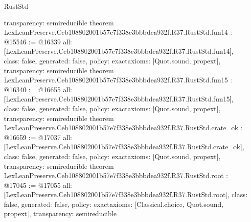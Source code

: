 \begin{lexlean}{RustStd}
\begin{coremodule}
{  transparency: semireducible
}
theorem LexLeanPreserve.Ceb108802001b57e7f338e3bbbdea932f.R37.RustStd.fun14 : @15546 := @16339 {
  all: [LexLeanPreserve.Ceb108802001b57e7f338e3bbbdea932f.R37.RustStd.fun14],
  class: false,
  generated: false,
  policy: exact{axioms: [Quot.sound, propext]},
  transparency: semireducible
}
theorem LexLeanPreserve.Ceb108802001b57e7f338e3bbbdea932f.R37.RustStd.fun15 : @16340 := @16655 {
  all: [LexLeanPreserve.Ceb108802001b57e7f338e3bbbdea932f.R37.RustStd.fun15],
  class: false,
  generated: false,
  policy: exact{axioms: [Quot.sound, propext]},
  transparency: semireducible
}
theorem LexLeanPreserve.Ceb108802001b57e7f338e3bbbdea932f.R37.RustStd.crate_ok : @16659 := @17037 {
  all: [LexLeanPreserve.Ceb108802001b57e7f338e3bbbdea932f.R37.RustStd.crate_ok],
  class: false,
  generated: false,
  policy: exact{axioms: [Quot.sound, propext]},
  transparency: semireducible
}
theorem LexLeanPreserve.Ceb108802001b57e7f338e3bbbdea932f.R37.RustStd.root : @17045 := @17055 {
  all: [LexLeanPreserve.Ceb108802001b57e7f338e3bbbdea932f.R37.RustStd.root],
  class: false,
  generated: false,
  policy: exact{axioms: [Classical.choice, Quot.sound, propext]},
  transparency: semireducible
}


\end{coremodule}
\end{lexlean}
